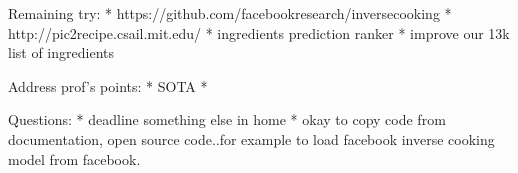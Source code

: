 \documentclass{article}
\begin{document}
Remaining try:
* https://github.com/facebookresearch/inversecooking
* http://pic2recipe.csail.mit.edu/
* ingredients prediction ranker
* improve our 13k list of ingredients

Address prof's points:
* SOTA
* 


Questions:
* deadline something else in home
* okay to copy code from documentation, open source code..for example to load facebook inverse cooking model from facebook.
\end{document}
